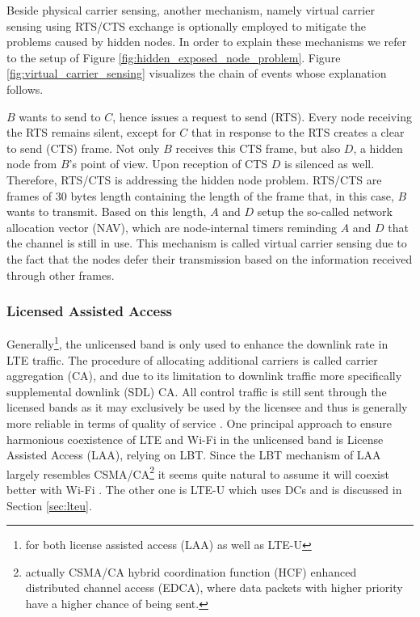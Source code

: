 Beside physical carrier sensing, another mechanism, namely virtual carrier sensing using RTS/CTS exchange is optionally employed to mitigate the problems caused by hidden nodes. In order to explain these mechanisms we refer to the setup of Figure \ref{fig:hidden_exposed_node_problem}. Figure \ref{fig:virtual_carrier_sensing} visualizes the chain of events whose explanation follows.

$B$ wants to send to $C$, hence issues a request to send (RTS). Every node receiving the RTS remains silent, except for $C$ that in response to the RTS creates a clear to send (CTS) frame. Not only $B$ receives this CTS frame, but also $D$, a hidden node from $B$'s point of view. Upon reception of CTS $D$ is silenced as well. Therefore, RTS/CTS is addressing the hidden node problem. RTS/CTS are frames of 30 bytes length containing the length of the frame that, in this case, $B$ wants to transmit. Based on this length, $A$ and $D$ setup the so-called network allocation vector (NAV), which are node-internal timers reminding $A$ and $D$ that the channel is still in use. This mechanism is called virtual carrier sensing due to the fact that the nodes defer their transmission based on the information received through other frames.

\subsubsection{Licensed Assisted Access}
Generally\footnote{for both license assisted access (LAA) as well as LTE-U}, the unlicensed band is only used to enhance the downlink rate in LTE traffic. The procedure of allocating additional carriers is called carrier aggregation (CA), and due to its limitation to downlink traffic more specifically supplemental downlink (SDL) CA. All control traffic is still sent through the licensed bands as it may exclusively be used by the licensee and thus is generally more reliable in terms of quality of service \cite{qualcomm15}.
One principal approach to ensure harmonious coexistence of LTE and Wi-Fi in the unlicensed band is License Assisted Access (LAA), relying on LBT. Since the LBT mechanism of LAA largely resembles CSMA/CA\footnote{actually CSMA/CA hybrid coordination function (HCF) enhanced distributed channel access (EDCA), where data packets with higher priority have a higher chance of being sent.} it seems quite natural to assume it will coexist better with Wi-Fi \cite{kwon17}. The other one is LTE-U which uses DCs and is discussed in Section \ref{sec:lteu}. 

